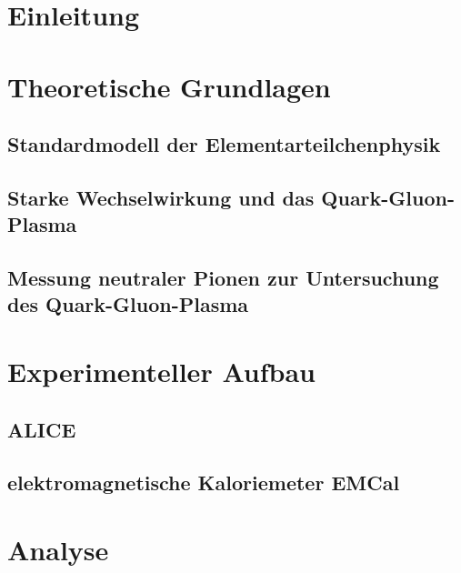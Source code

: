 \documentclass[11pt]{article}
\author{Marvin Hemmer}
\begin{document}
\begin{titlepage}
\begin{center}

\end{center}
\end{titlepage}
\newpage
\tableofcontents
\newpage

\section*{Einleitung}

\section{Theoretische Grundlagen} \label{s1}

\subsection{Standardmodell der Elementarteilchenphysik} \label{s1s1}

\subsection{Starke Wechselwirkung und das Quark-Gluon-Plasma} \label{s1s2}

\subsection{Messung neutraler Pionen zur Untersuchung des Quark-Gluon-Plasma} \label{s1s3}


\section{Experimenteller Aufbau} \label{s2}

\subsection{ALICE} \label{s2s1}

\subsection{elektromagnetische Kaloriemeter EMCal} \label{s2s2}


\section{Analyse} \label{s3}
\end{document}
